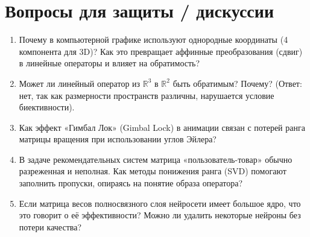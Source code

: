 \documentclass[a4paper,12pt]{article}
\begin{document}
\section{Вопросы для защиты / дискуссии}
\begin{enumerate}[label=\textbf{\alph*)}, leftmargin=*, itemsep=0.5em]
    \item Почему в компьютерной графике используют однородные координаты (4 компонента для 3D)? Как это превращает аффинные преобразования (сдвиг) в линейные операторы и влияет на обратимость?
    \item Может ли линейный оператор из $\mathbb{R}^3$ в $\mathbb{R}^2$ быть обратимым? Почему? (Ответ: нет, так как размерности пространств различны, нарушается условие биективности).
    \item Как эффект «Гимбал Лок» (Gimbal Lock) в анимации связан с потерей ранга матрицы вращения при использовании углов Эйлера?
    \item В задаче рекомендательных систем матрица «пользователь-товар» обычно разреженная и неполная. Как методы понижения ранга (SVD) помогают заполнить пропуски, опираясь на понятие образа оператора?
    \item Если матрица весов полносвязного слоя нейросети имеет большое ядро, что это говорит о её эффективности? Можно ли удалить некоторые нейроны без потери качества?
\end{enumerate}
\end{document}
